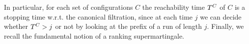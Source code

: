 In particular, for each set of configurations $C$ the reachability time 
$T^{C}$ of $C$ is a stopping time w.r.t. the canonical filtration, since 
at each time $j$ we can decide whether $T^{C}>j$ or not by looking at the 
prefix of a run of length $j$. 
Finally, we recall the fundamental notion of a ranking 
supermartingale.

